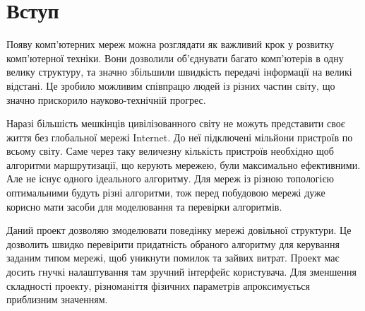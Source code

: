 \documentclass[a4paper, ukrainian, utf8, simple]{eskdtext}
\begin{document}
\maketitle



\tableofcontents
\newpage

\section{Вступ}
Появу комп'ютерних мереж можна розглядати як важливий крок у розвитку
комп'ютерної техніки. Вони дозволили об'єднувати багато комп'ютерів в
одну велику структуру, та значно збільшили швидкість передачі інформації
на великі відстані. Це зробило можливим співпрацю людей із різних частин 
світу, що значно прискорило науково-технічній прогрес.

Наразі більшість мешкінців цивілізованного світу не можуть представити 
своє життя без глобальної мережі Internet. До неї підключені мільйони 
пристроїв по всьому світу. Саме через таку величезну кількість пристроїв 
необхідно щоб алгоритми маршрутизації, що керують мережею, були максимально
ефективними. Але не існує одного ідеального алгоритму. Для мереж із різною 
топологією оптимальними будуть різні алгоритми, тож перед побудовою мережі
дуже корисно мати засоби для моделювання та перевірки алгоритмів.

Даний проект дозволяю змоделювати поведінку мережі довільної структури.
Це дозволить швидко перевірити придатність обраного алгоритму для керування
заданим типом мережі, щоб уникнути помилок та зайвих витрат. Проект має 
досить гнучкі налаштування там зручний інтерфейс користувача. Для зменшення
складності проекту, різноманіття фізичних параметрів апроксимується приблизним
значенням. 
\end{document}
